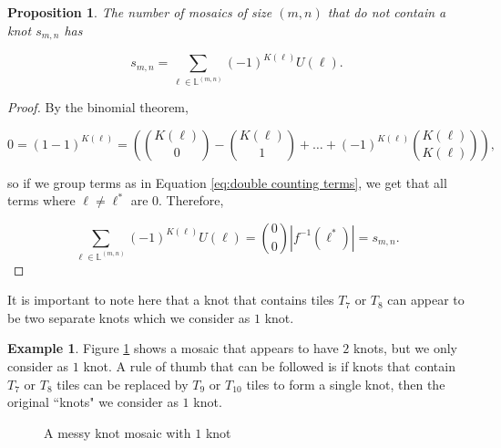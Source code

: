 \documentclass[12pt]{article}
\theoremstyle{plain}
\newtheorem{prop}[thm]{Proposition}
\theoremstyle{definition}
\theoremstyle{remark}
\theoremstyle{definition}
\newtheorem{exmp}{Example}[section]
\newcommand{\cell}[4]{ \draw[thick] ( #1 , #2 ) rectangle ( #3 , #4 );}
\newcommand{\cellA}[4]{\draw[red, thick, densely dotted] ( #1 + 0.5 , #2 ) arc(0:90:{0.5}); \draw[thick] ( #1 , #2 ) rectangle ( #3 , #4 );}
\newcommand{\cellB}[4]{\draw[red, thick, densely dotted] ( #1 + 1 , #2 + 0.5 ) arc(90:180:{0.5}); \draw[thick] ( #1 , #2 ) rectangle ( #3 , #4 );}
\newcommand{\cellC}[4]{\draw[red, thick, densely dotted] ( #1 + 0.5, #2 + 1 ) arc(180:270:{0.5}); \draw[thick] ( #1 , #2 ) rectangle ( #3 , #4 );}
\newcommand{\cellD}[4]{\draw[red, thick, densely dotted] ( #1 , #2 + 0.5 ) arc(-90:0:{0.5}); \draw[thick] ( #1 , #2 ) rectangle ( #3 , #4 );}
\newcommand{\cellE}[4]{\draw[red, thick, densely dotted] (#3, #4 * 0.5 + #2 * 0.5) -- (#1, #4 * 0.5 + #2 * 0.5); \draw[thick] ( #1 , #2 ) rectangle ( #3 , #4 );}
\newcommand{\cellF}[4]{\draw[red, thick, densely dotted] (#3 * 0.5 + #1 * 0.5 , #2) -- (#3 * 0.5 + #1 * 0.5 , #4); \draw[thick] ( #1 , #2 ) rectangle ( #3 , #4 );}
\newcommand{\cellG}[4]{\draw[red, thick, densely dotted] ( #1 + 0.5 , #2 ) arc(0:90:{0.5}); \draw[red, thick, densely dotted] ( #1 + 0.5, #2 + 1 ) arc(180:270:{0.5}); \draw[thick] ( #1 , #2 ) rectangle ( #3 , #4 );}
\newcommand{\cellH}[4]{\draw[red, thick, densely dotted] ( #1 , #2 + 0.5 ) arc(-90:0:{0.5}); \draw[red, thick, densely dotted] ( #1 + 1 , #2 + 0.5 ) arc(90:180:{0.5}); \draw[thick] ( #1 , #2 ) rectangle ( #3 , #4 );}
\newcommand{\cellI}[4]{\draw[red, thick, densely dotted] (#3 * 0.5 + #1 * 0.5 , #2) -- (#3 * 0.5 + #1 * 0.5 , #4); \node[shape=circle,draw=none,fill=white, inner sep=3pt,minimum size=5pt] (A) at ( #1 + 0.5 , #2 + 0.5 ) {}; \draw[red, thick, densely dotted] (#3, #4 * 0.5 + #2 * 0.5) -- (#1, #4 * 0.5 + #2 * 0.5); \draw[thick] ( #1 , #2 ) rectangle ( #3 , #4 );}
\newcommand{\cellAf}[4]{\filldraw[gray!40] ( #1 , #2 ) rectangle ( #3 , #4 ); \draw[red, thick, densely dotted] ( #1 + 0.5 , #2 ) arc(0:90:{0.5}); \draw[thick] ( #1 , #2 ) rectangle ( #3 , #4 );}
\newcommand{\cellBf}[4]{\filldraw[gray!40] ( #1 , #2 ) rectangle ( #3 , #4 ); \draw[red, thick, densely dotted] ( #1 + 1 , #2 + 0.5 ) arc(90:180:{0.5}); \draw[thick] ( #1 , #2 ) rectangle ( #3 , #4 );}
\newcommand{\cellCf}[4]{\filldraw[gray!40] ( #1 , #2 ) rectangle ( #3 , #4 ); \draw[red, thick, densely dotted] ( #1 + 0.5, #2 + 1 ) arc(180:270:{0.5}); \draw[thick] ( #1 , #2 ) rectangle ( #3 , #4 );}
\newcommand{\cellDf}[4]{\filldraw[gray!40] ( #1 , #2 ) rectangle ( #3 , #4 ); \draw[red, thick, densely dotted] ( #1 , #2 + 0.5 ) arc(-90:0:{0.5}); \draw[thick] ( #1 , #2 ) rectangle ( #3 , #4 );}
\newcommand{\cellFf}[4]{\filldraw[gray!40] ( #1 , #2 ) rectangle ( #3 , #4 ); \draw[red, thick, densely dotted] (#3 * 0.5 + #1 * 0.5 , #2) -- (#3 * 0.5 + #1 * 0.5 , #4); \draw[thick] ( #1 , #2 ) rectangle ( #3 , #4 );}
\newcommand{\cellHf}[4]{\filldraw[gray!40] ( #1 , #2 ) rectangle ( #3 , #4 ); \draw[red, thick, densely dotted] ( #1 , #2 + 0.5 ) arc(-90:0:{0.5}); \draw[red, thick, densely dotted] ( #1 + 1 , #2 + 0.5 ) arc(90:180:{0.5}); \draw[thick] ( #1 , #2 ) rectangle ( #3 , #4 );}
\begin{document}
\begin{prop}
    The number of mosaics of size $(m,n)$ that do not contain a knot $s_{m,n}$ has

    \begin{equation}
    s_{m,n} = \sum_{\ell \in \mathbb{L}^{(m,n)}} (-1)^{K(\ell)} U(\ell).
    \label{eq:ugly inc excl}
    \end{equation}
\end{prop}

\begin{proof}
    By the binomial theorem,
    
    $$0 = (1-1)^{K(\ell)} = \left(\binom{K(\ell)}{0} - \binom{K(\ell)}{1} + \dots + (-1)^{K(\ell)}\binom{K(\ell)}{K(\ell)}\right),$$
    
    so if we group terms as in Equation \ref{eq:double counting terms}, we get that all terms where $\ell \neq \ell^*$ are $0$. Therefore, 
    
    $$\sum_{\ell \in \mathbb{L}^{(m,n)}} (-1)^{K(\ell)} U(\ell) = \binom{0}{0}|f^{-1}(\ell^*)| = s_{m,n}.$$
\end{proof}

It is important to note here that a knot that contains tiles $T_7$ or $T_8$ can appear to be two separate knots which we consider as $1$ knot.

\begin{exmp}
Figure \ref{fig:messy multi knot} shows a mosaic that appears to have $2$ knots, but we only consider as $1$ knot. A rule of thumb that can be followed is if knots that contain $T_7$ or $T_8$ tiles can be replaced by $T_9$ or $T_{10}$ tiles to form a single knot, then the original ``knots" we consider as $1$ knot.

\begin{figure}[h!]
\begin{center}


\end{center}
\caption{A messy knot mosaic with $1$ knot}
\label{fig:messy multi knot}
\end{figure}

\end{exmp}
\end{document}
